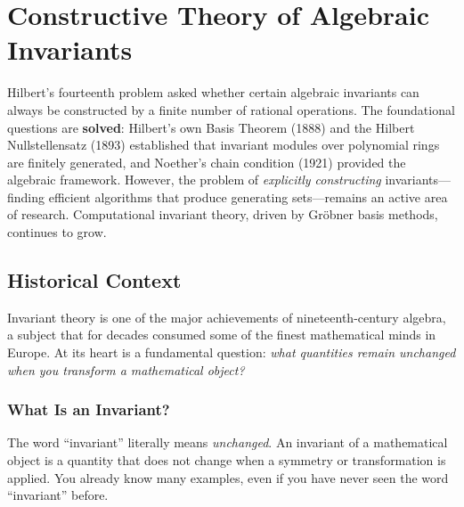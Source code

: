 
\chapter{Constructive Theory of Algebraic Invariants}

\begin{partiallybox}
Hilbert's fourteenth problem asked whether certain algebraic invariants can always be constructed by a finite number of rational operations. The foundational questions are \textbf{solved}: Hilbert's own Basis Theorem (1888) and the Hilbert Nullstellensatz (1893) established that invariant modules over polynomial rings are finitely generated, and Noether's chain condition (1921) provided the algebraic framework. However, the problem of \emph{explicitly constructing} invariants---finding efficient algorithms that produce generating sets---remains an active area of research. Computational invariant theory, driven by Gr\"obner basis methods, continues to grow.
\end{partiallybox}

\section{Historical Context}

Invariant theory is one of the major achievements of nineteenth-century algebra, a subject that for decades consumed some of the finest mathematical minds in Europe. At its heart is a fundamental question: \emph{what quantities remain unchanged when you transform a mathematical object?}

\subsection{What Is an Invariant?}

The word ``invariant'' literally means \emph{unchanged}. An invariant of a mathematical object is a quantity that does not change when a symmetry or transformation is applied. You already know many examples, even if you have never seen the word ``invariant'' before.

